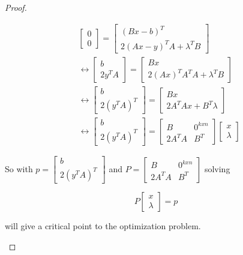 \begin{proof}
\begin{itemize}
\begin{align*}
    &\begin{bmatrix}  
        0 \\ 0 
    \end{bmatrix}    
    = 
    \begin{bmatrix}  
        (Bx-b)^T \\ 2(Ax-y)^TA+ \lambda^T B 
    \end{bmatrix}\\ 
    &\leftrightarrow
    \begin{bmatrix}  
        b \\ 2y^TA 
    \end{bmatrix} 
    =
    \begin{bmatrix}  
        Bx\\ 2(Ax)^TA^TA+ \lambda^T B 
    \end{bmatrix} \\
    &\leftrightarrow
    \begin{bmatrix}  
        b \\ 2(y^TA)^T
    \end{bmatrix} 
    =
    \begin{bmatrix}  
        Bx\\ 2A^TAx  + B^T\lambda 
    \end{bmatrix} \\
    &\leftrightarrow
    \begin{bmatrix}  
        b \\ 2(y^TA)^T
    \end{bmatrix} 
    =
    \begin{bmatrix}  
        B & 0^{kxn}\\ 2A^TA  & B^T 
    \end{bmatrix} 
    \begin{bmatrix}  
        x \\ \lambda 
    \end{bmatrix} 
\end{align*}

So with $p=\begin{bmatrix}  b \\ 2(y^TA)^T \end{bmatrix} $ and $P=\begin{bmatrix}  B & 0^{kxn}\\ 2A^TA  & B^T \end{bmatrix} $ solving 

\[
P  \begin{bmatrix}  x \\ \lambda \end{bmatrix} =p   
\]

will give a critical point to the optimization problem.
\end{itemize}
\end{proof}